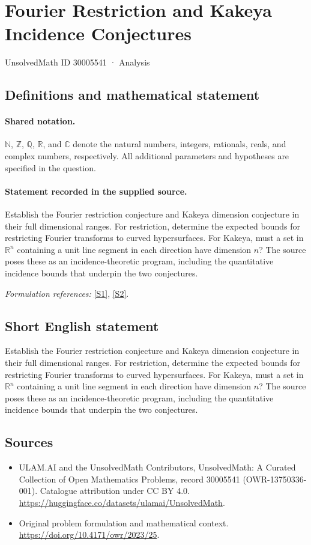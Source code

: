 \documentclass[11pt]{article}
\newcommand{\sref}[2]{\hyperlink{source:#1:#2}{[S#2]}}
\begin{document}
\setcounter{section}{30005540}
\section{Fourier Restriction and Kakeya Incidence Conjectures}\label{30005541}
{\small UnsolvedMath ID 30005541 · Analysis}
\subsection{Definitions and mathematical statement}

\paragraph{Shared notation.}$\mathbb N$, $\mathbb Z$, $\mathbb Q$, $\mathbb R$, and $\mathbb C$ denote the natural numbers, integers, rationals, reals, and complex numbers, respectively. All additional parameters and hypotheses are specified in the question.


\paragraph{Statement recorded in the supplied source.}
Establish the Fourier restriction conjecture and Kakeya dimension conjecture in their full dimensional ranges. For restriction, determine the expected bounds for restricting Fourier transforms to curved hypersurfaces. For Kakeya, must a set in $\mathbb R^n$ containing a unit line segment in each direction have dimension $n$? The source poses these as an incidence-theoretic program, including the quantitative incidence bounds that underpin the two conjectures.
\par\smallskip\textit{Formulation references:} \sref{30005541}{1}, \sref{30005541}{2}.
\subsection{Short English statement}
Establish the Fourier restriction conjecture and Kakeya dimension conjecture in their full dimensional ranges. For restriction, determine the expected bounds for restricting Fourier transforms to curved hypersurfaces. For Kakeya, must a set in $\mathbb R^n$ containing a unit line segment in each direction have dimension $n$? The source poses these as an incidence-theoretic program, including the quantitative incidence bounds that underpin the two conjectures.
\subsection{Sources}
\begin{itemize}
\item[\hypertarget{source:30005541:1}{S1}] ULAM.AI and the UnsolvedMath Contributors, UnsolvedMath: A Curated Collection of Open Mathematics Problems, record 30005541 (OWR-13750336-001). Catalogue attribution under CC BY 4.0.
\url{https://huggingface.co/datasets/ulamai/UnsolvedMath}.
\item[\hypertarget{source:30005541:2}{S2}] Original problem formulation and mathematical context.
\url{https://doi.org/10.4171/owr/2023/25}.
\end{itemize}
\label{end:30005541}
\end{document}

